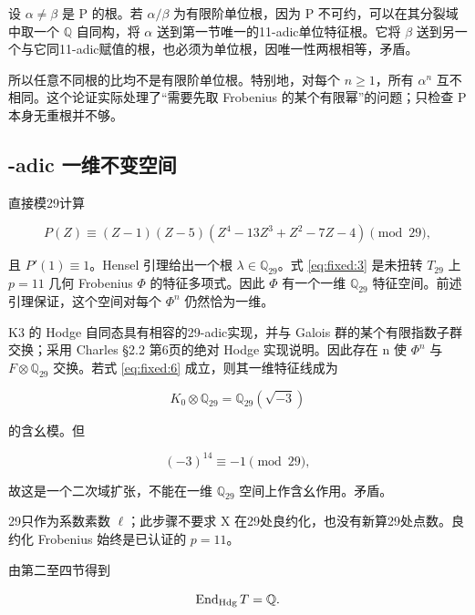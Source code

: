 \documentclass[11pt,a4paper,oneside]{ctexrep}
\theoremstyle{cnplain}
\theoremstyle{definition}
\theoremstyle{remark}
\begin{document}
设 \(\alpha\ne\beta\) 是 P 的根。若 \(\alpha/\beta\) 为有限阶单位根，因为 P 不可约，可以在其分裂域中取一个 \(\mathbb Q\) 自同构，将 \(\alpha\) 送到第一节唯一的11-adic单位特征根。它将 \(\beta\) 送到另一个与它同11-adic赋值的根，也必须为单位根，因唯一性两根相等，矛盾。

所以任意不同根的比均不是有限阶单位根。特别地，对每个 \(n\ge1\)，所有 \(\alpha^n\) 互不相同。这个论证实际处理了``需要先取 Frobenius 的某个有限幂''的问题；只检查 P 本身无重根并不够。

\subsection{-adic 一维不变空间}\label{sec:fixed:29}

直接模29计算

\begin{equation}
P(Z)\equiv(Z-1)(Z-5)(Z^4-13Z^3+Z^2-7Z-4)\pmod {29},            \label{eq:fixed:7}
\end{equation}

且 \(P'(1)\equiv1\)。Hensel 引理给出一个根 \(\lambda\in\mathbb Q_{29}\)。式 \eqref{eq:fixed:3} 是未扭转 \(T_{29}\) 上 \(p=11\) 几何 Frobenius \(\Phi\) 的特征多项式。因此 \(\Phi\) 有一个一维 \(\mathbb Q_{29}\) 特征空间。前述引理保证，这个空间对每个 \(\Phi^n\) 仍然恰为一维。

K3 的 Hodge 自同态具有相容的29-adic实现，并与 Galois 群的某个有限指数子群交换；采用 Charles §2.2 第6页的绝对 Hodge 实现说明。因此存在 n 使 \(\Phi^n\) 与 \(F\otimes\mathbb Q_{29}\) 交换。若式 \eqref{eq:fixed:6} 成立，则其一维特征线成为

\begin{equation}
K_0\otimes\mathbb Q_{29}=\mathbb Q_{29}(\sqrt{-3})
\end{equation}

的含幺模。但

\begin{equation}
(-3)^{14}\equiv-1\pmod {29},
\end{equation}

故这是一个二次域扩张，不能在一维 \(\mathbb Q_{29}\) 空间上作含幺作用。矛盾。

29只作为系数素数 \(\ell\)；此步骤不要求 X 在29处良约化，也没有新算29处点数。良约化 Frobenius 始终是已认证的 \(p=11\)。

由第二至四节得到

\begin{equation}
\operatorname{End}_{\rm Hdg}T=\mathbb Q.
                                                                    \label{eq:fixed:8}
\end{equation}
\end{document}
